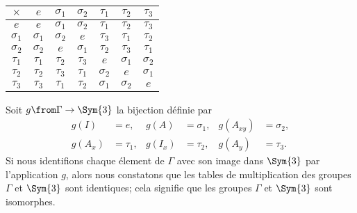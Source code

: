 \begin{center}
  \begin{tabular}{c|cccccc}
    $\times$   &        $e$ & $\sigma_1$ & $\sigma_2$ &   $\tau_1$ &   $\tau_2$ &   $\tau_3$ \\
    \midrule
           $e$ &        $e$ & $\sigma_1$ & $\sigma_2$ &   $\tau_1$ &   $\tau_2$ &   $\tau_3$ \\
    $\sigma_1$ & $\sigma_1$ & $\sigma_2$ &        $e$ &   $\tau_3$ &   $\tau_1$ &   $\tau_2$ \\
    $\sigma_2$ & $\sigma_2$ &        $e$ & $\sigma_1$ &   $\tau_2$ &   $\tau_3$ &   $\tau_1$ \\
      $\tau_1$ &   $\tau_1$ &   $\tau_2$ &   $\tau_3$ &        $e$ & $\sigma_1$ & $\sigma_2$ \\
      $\tau_2$ &   $\tau_2$ &   $\tau_3$ &   $\tau_1$ & $\sigma_2$ &        $e$ & $\sigma_1$ \\
      $\tau_3$ &   $\tau_3$ &   $\tau_1$ &   $\tau_2$ & $\sigma_1$ & $\sigma_2$ &        $e$ \\
  \end{tabular}
\end{center}

Soit $g\from\Gamma\to\Sym{3}$ la bijection définie par
%
\begin{align*}
  g(I)   &= e,      & g(A)   &= \sigma_1, & g(A_{xy}) &= \sigma_2, \\
  g(A_x) &= \tau_1, & g(I_x) &= \tau_2,   &g(A_y) &= \tau_3.
\end{align*}
%
Si nous identifions chaque élement de $\Gamma$ avec son image dans $\Sym{3}$ par l'application $g$, alors nous constatons que les tables de multiplication des groupes $\Gamma$ et $\Sym{3}$ sont identiques; cela signifie que les groupes $\Gamma$ et $\Sym{3}$ sont isomorphes.
